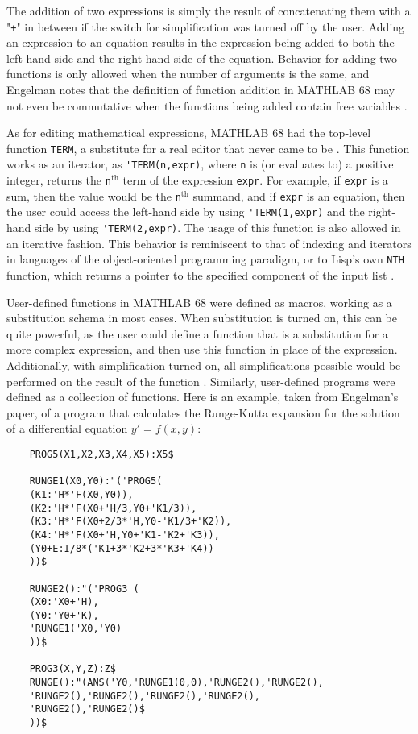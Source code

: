 The addition of two expressions is simply the result of concatenating them with a "\verb|+|" in between if the switch for simplification was turned off by the user. Adding an expression to an equation results in the expression being added to both the left-hand side and the right-hand side of the equation. Behavior for adding two functions is only allowed when the number of arguments is the same, and Engelman notes that the definition of function addition in MATHLAB 68 may not even be commutative when the functions being added contain free variables \parencite{engelman1971legacy}.

As for editing mathematical expressions, MATHLAB 68 had the top-level function \verb|TERM|, a substitute for a real editor that never came to be \parencite{engelman1971legacy}. This function works as an iterator, as \verb|'TERM(n,expr)|, where \verb|n| is (or evaluates to) a positive integer, returns the \verb|n|$^\text{th}$ term of the expression \verb|expr|. For example, if \verb|expr| is a sum, then the value would be the \verb|n|$^\text{th}$ summand, and if \verb|expr| is an equation, then the user could access the left-hand side by using \verb|'TERM(1,expr)| and the right-hand side by using \verb|'TERM(2,expr)|. The usage of this function is also allowed in an iterative fashion. This behavior is reminiscent to that of indexing and iterators in languages of the object-oriented programming paradigm, or to Lisp's own \verb|NTH| function, which returns a pointer to the specified component of the input list \parencite{touretzky2013common}.

User-defined functions in MATHLAB 68 were defined as macros, working as a substitution schema in most cases. When substitution is turned on, this can be quite powerful, as the user could define a function that is a substitution for a more complex expression, and then use this function in place of the expression. Additionally, with simplification turned on, all simplifications possible would be performed on the result of the function \parencite{engelman1971legacy}. Similarly, user-defined programs were defined as a collection of functions. Here is an example, taken from Engelman's paper, of a program that calculates the Runge-Kutta expansion for the solution of a differential equation $y' = f(x,y)$:

\begin{verbatim}
    PROG5(X1,X2,X3,X4,X5):X5$

    RUNGE1(X0,Y0):"('PROG5(
    (K1:'H*'F(X0,Y0)),
    (K2:'H*'F(X0+'H/3,Y0+'K1/3)),
    (K3:'H*'F(X0+2/3*'H,Y0-'K1/3+'K2)),
    (K4:'H*'F(X0+'H,Y0+'K1-'K2+'K3)),
    (Y0+E:I/8*('K1+3*'K2+3*'K3+'K4))
    ))$

    RUNGE2():"('PROG3 (
    (X0:'X0+'H),
    (Y0:'Y0+'K),
    'RUNGE1('X0,'Y0)
    ))$

    PROG3(X,Y,Z):Z$
    RUNGE():"(ANS('Y0,'RUNGE1(0,0),'RUNGE2(),'RUNGE2(),
    'RUNGE2(),'RUNGE2(),'RUNGE2(),'RUNGE2(),
    'RUNGE2(),'RUNGE2()$
    ))$
\end{verbatim}

